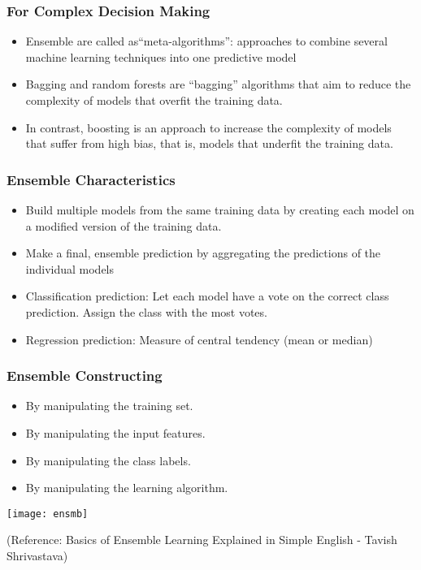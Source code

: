 \begin{frame}[fragile]\frametitle{For Complex Decision Making}
\begin{itemize}
\item Ensemble are called as``meta-algorithms'': approaches to combine several machine learning techniques into one predictive model
\item Bagging and random forests are ``bagging'' algorithms that aim to reduce the complexity of models that overfit the training data.
\item In contrast, boosting is an approach to increase the complexity of models that suffer from high bias, that is, models that underfit the training data.
\end{itemize}
\end{frame}

\begin{frame}[fragile]\frametitle{Ensemble Characteristics}
\begin{itemize}
\item Build multiple models from the same training data by creating each model on a modified version of the training data.
\item Make a final, ensemble prediction by aggregating the predictions of the individual models
\item Classification prediction: Let each model have a vote on the correct class prediction. Assign the class with the most votes.
\item Regression prediction: Measure of central tendency (mean or median)
\end{itemize}
\end{frame}



\begin{frame}[fragile]\frametitle{Ensemble Constructing}
\begin{itemize}
\item By manipulating the training set.
\item By manipulating the input features.
\item By manipulating the class labels.
\item By manipulating the learning algorithm.
\end{itemize}
\begin{center}
\texttt{[image: ensmb]}
\end{center}
\tiny{(Reference: Basics of Ensemble Learning Explained in Simple English - Tavish Shrivastava)}
\end{frame}

